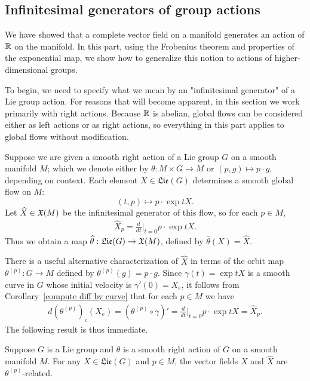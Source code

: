 \subsection{Infinitesimal generators of group actions}
We have showed that a complete vector field on a manifold generates an action of $\mathbb{R}$ on the manifold. In this part, using the Frobenius theorem and properties of the exponential map, we show how to generalize this notion to actions of higher-dimensional groups.\par
To begin, we need to specify what we mean by an "infinitesimal generator" of a Lie group action. For reasons that will become apparent, in this section we work primarily with right actions. Because $\mathbb{R}$ is abelian, global flows can be considered either as left actions or as right actions, so everything in this part applies to global flows without modification.\par
Suppose we are given a smooth right action of a Lie group $G$ on a smooth manifold $M$; which we denote either by $\theta:M\times G\to M$ or $(p,g)\mapsto p\cdot g$, depending on context. Each element $X\in\mathfrak{Lie}(G)$ determines a smooth global flow on $M$:
\[(t,p)\mapsto p\cdot \exp tX.\]
Let $\widehat{X}\in\mathfrak{X}(M)$ be the infinitesimal generator of this flow, so for each $p\in M$,
\begin{align}\label{infinitesimal generator}
\widehat{X}_p=\frac{d}{dt}\Big|_{t=0}p\cdot\exp tX.
\end{align}
Thus we obtain a map $\widehat{\theta}:\mathfrak{Lie}(G)\to\mathfrak{X}(M)$, defined by $\widehat{\theta}(X)=\widehat{X}$.\par
There is a useful alternative characterization of $\widehat{X}$ in terms of the orbit map $\theta^{(p)}:G\to M$ defined by $\theta^{(p)}(g)=p\cdot g$. Since $\gamma(t)=\exp tX$ is a smooth curve in $G$ whose initial velocity is $\gamma'(0)=X_e$, it follows from Corollary~\ref{compute diff by curve} that for each $p\in M$ we have
\begin{align}\label{infinitesimal generator diff of orbit map}
 d(\theta^{(p)})_e(X_e)=(\theta^{(p)}\circ\gamma)'=\frac{d}{dt}\Big|_{t=0}p\cdot\exp tX=\widehat{X}_p.
\end{align}
The following result is thus immediate.
\begin{proposition}\label{infinitesimal generator is orbit map related}
Suppose $G$ is a Lie group and $\theta$ is a smooth right action of $G$ on a smooth manifold $M$. For any $X\in\mathfrak{Lie}(G)$ and $p\in M$, the vector fields $X$ and $\widehat{X}$ are $\theta^{(p)}$-related.
\end{proposition}
